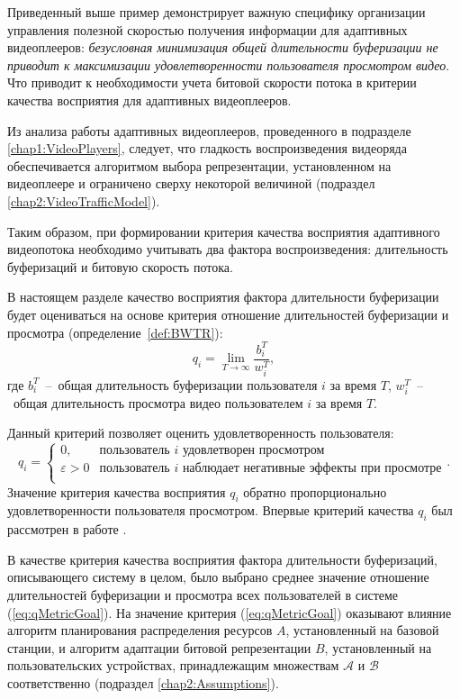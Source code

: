 Приведенный выше пример демонстрирует важную специфику организации управления полезной скоростью получения информации для адаптивных видеоплееров: \textit{безусловная минимизация общей длительности буферизации не приводит к максимизации удовлетворенности пользователя просмотром видео}. Что приводит к необходимости учета битовой скорости потока в критерии качества восприятия для адаптивных видеоплееров.

Из анализа работы адаптивных видеоплееров, проведенного в подразделе \ref{chap1:VideoPlayers}, следует, что гладкость воспроизведения видеоряда обеспечивается алгоритмом выбора репрезентации, установленном на видеоплеере и ограничено сверху некоторой величиной (подраздел \ref{chap2:VideoTrafficModel}).

Таким образом, при формировании критерия качества восприятия адаптивного видеопотока необходимо учитывать два фактора воспроизведения: длительность буферизаций и битовую скорость потока.

В настоящем разделе качество восприятия фактора длительности буферизации будет оцениваться на основе критерия отношение длительностей буферизации и просмотра (определение~\ref{def:BWTR}): $$q_i = \lim\limits_{T\rightarrow\infty} \frac{b_i^T}{w_i^T},$$
где $b_i^T$~--~общая длительность буферизации пользователя $i$ за время $T$, $w_i^T$~--~общая длительность просмотра видео пользователем $i$ за время $T$.

Данный критерий позволяет оценить удовлетворенность пользователя:
$$q_i=
\begin{cases}
0, & \text{пользователь $i$ удовлетворен просмотром}\\
\varepsilon > 0 & \text{пользователь $i$ наблюдает негативные эффекты при просмотре}\\
\end{cases}.
$$
Значение критерия качества восприятия $q_i$ обратно пропорционально удовлетворенности пользователя просмотром. Впервые критерий качества $q_i$ был рассмотрен в работе \cite{Bakin_Globecom}.

В качестве критерия качества восприятия фактора длительности буферизаций, описывающего систему в целом, было выбрано среднее значение отношение длительностей буферизации и просмотра всех пользователей в системе (\ref{eq:qMetricGoal}). На значение критерия (\ref{eq:qMetricGoal}) оказывают влияние алгоритм планирования распределения ресурсов $A$, установленный на базовой станции, и алгоритм адаптации битовой репрезентации $B$, установленный на пользовательских устройствах, принадлежащим множествам $\mathcal{A}$ и $\mathcal{B}$ соответственно (подраздел \ref{chap2:Assumptions}).

